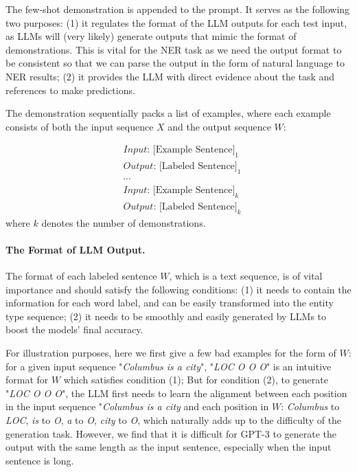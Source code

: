 \documentclass{article}
\begin{document}
The few-shot demonstration is appended to the prompt.
It
 serves as the following two purposes: 
(1) it regulates the format of the LLM outputs for each test input, as 
LLMs will (very likely)
generate outputs that mimic the format of demonstrations. This is vital for the NER task as we need the output format to be consistent so that we can parse the output in the form of natural language 
to NER results; (2) it provides the LLM with direct evidence about the task and references to make predictions. 

The demonstration sequentially packs a list of examples, where each example consists of both the input sequence $X$ and the output sequence $W$: 


\begin{equation}
\nonumber
    \begin{aligned}
      	&\textit{Input: }\text{[Example Sentence]}_{1} \\
      	&\textit{Output: }\text{[Labeled Sentence]}_{1} \\
      	&\cdots \\
      	&\textit{Input: }\text{[Example Sentence]}_{k} \\
      	&\textit{Output: }\text{[Labeled Sentence]}_{k}
    \end{aligned}
\end{equation}
where $k$ denotes the number of demonstrations. 

\paragraph{The Format of LLM Output.}
\label{llm_format}
The format of each labeled sentence $W$, which is a text sequence, is of vital importance and should satisfy the following conditions:
(1) it needs to contain the information for each word label, and can be easily transformed into the entity type sequence; 
(2) it needs to be smoothly and easily generated by LLMs to boost the models' final accuracy. 

For illustration purposes, here we first give a few bad examples for the form of $W$: 
for a given input sequence "{\it Columbus is a city}", 
"{\it LOC O O O}" is an intuitive format for $W$ which satisfies condition (1); 
But for condition (2), to generate "{\it LOC O O O}", the LLM first needs to learn the alignment between each position in the input sequence "{\it Columbus is a city} and each position in $W$: {\it Columbus} to 
{\it LOC}, {\it is} to 
{\it O}, {\it a} to 
{\it O}, 
{\it city} to {\it O}, 
which naturally adds up to the difficulty of the generation task.
However, we find that it is difficult for GPT-3 to generate the output with the same length as the input sentence, especially when the input sentence is long.
\end{document}
